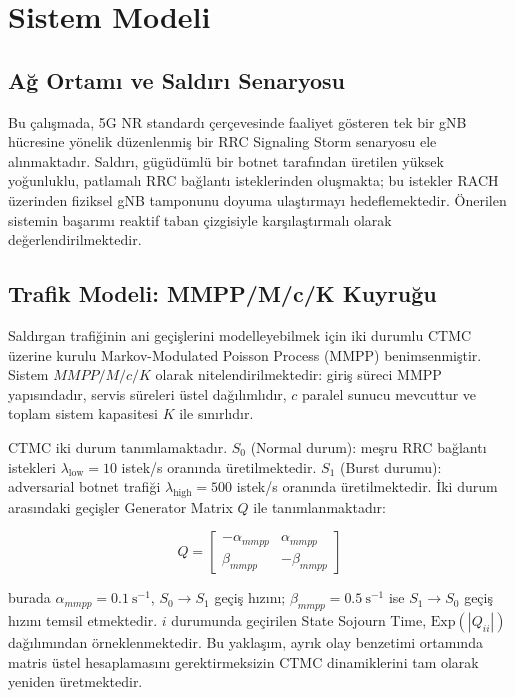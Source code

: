 \documentclass[conference]{IEEEtran}
\begin{document}
\section{Sistem Modeli}

\subsection{Ağ Ortamı ve Saldırı Senaryosu}

Bu çalışmada, 5G NR standardı çerçevesinde faaliyet gösteren tek bir gNB
hücresine yönelik düzenlenmiş bir RRC Signaling Storm senaryosu ele alınmaktadır.
Saldırı, gügüdümlü bir botnet tarafından üretilen yüksek yoğunluklu, patlamalı
RRC bağlantı isteklerinden oluşmakta; bu istekler RACH üzerinden fiziksel gNB
tamponunu doyuma ulaştırmayı hedeflemektedir. Önerilen sistemin başarımı
reaktif taban çizgisiyle karşılaştırmalı olarak değerlendirilmektedir.

\subsection{Trafik Modeli: MMPP/M/c/K Kuyruğu}

Saldırgan trafiğinin ani geçişlerini modelleyebilmek için iki durumlu CTMC
üzerine kurulu Markov-Modulated Poisson Process (MMPP) benimsenmiştir. Sistem
$MMPP/M/c/K$ olarak nitelendirilmektedir: giriş süreci MMPP yapısındadır,
servis süreleri üstel dağılımlıdır, $c$ paralel sunucu mevcuttur ve toplam
sistem kapasitesi $K$ ile sınırlıdır.

CTMC iki durum tanımlamaktadır. $S_0$ (Normal durum): meşru RRC bağlantı
istekleri $\lambda_{\mathrm{low}} = 10$ istek/s oranında üretilmektedir. $S_1$
(Burst durumu): adversarial botnet trafiği $\lambda_{\mathrm{high}} = 500$
istek/s oranında üretilmektedir. İki durum arasındaki geçişler Generator
Matrix $Q$ ile tanımlanmaktadır:

\begin{equation}
Q = \begin{bmatrix}
    -\alpha_{mmpp} & \alpha_{mmpp} \\
    \beta_{mmpp}   & -\beta_{mmpp}
\end{bmatrix}
\label{eq:generator}
\end{equation}

\noindent burada $\alpha_{mmpp} = 0.1\ \mathrm{s}^{-1}$, $S_0 \to S_1$ geçiş
hızını; $\beta_{mmpp} = 0.5\ \mathrm{s}^{-1}$ ise $S_1 \to S_0$ geçiş hızını
temsil etmektedir. $i$ durumunda geçirilen State Sojourn Time,
$\mathrm{Exp}(|Q_{ii}|)$ dağılımından örneklenmektedir. Bu yaklaşım, ayrık olay
benzetimi ortamında matris üstel hesaplamasını gerektirmeksizin CTMC
dinamiklerini tam olarak yeniden üretmektedir.
\end{document}

